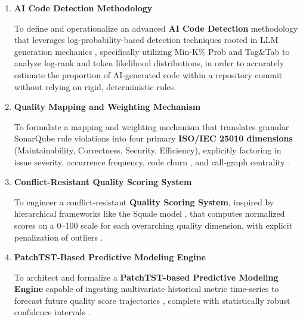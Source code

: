 \begin{enumerate}
    
    \item \textbf{AI Code Detection Methodology}

    To define and operationalize an advanced \textbf{AI Code Detection} methodology that leverages log-probability-based detection techniques rooted in LLM generation mechanics \parencite{excode_robust_explainable_model_detect_ai_generated_code}, specifically utilizing Min-K\% Prob and Tag\&Tab to analyze log-rank and token likelihood distributions, in order to accurately estimate the proportion of AI-generated code within a repository commit without relying on rigid, deterministic rules.
    
    \item \textbf{Quality Mapping and Weighting Mechanism}
    
    To formulate a mapping and weighting mechanism that translates granular SonarQube rule violations \parencite{sonarqube_metrics_definition} into four primary \textbf{ISO/IEC 25010 dimensions} \parencite{isoiec25010_quality_model_emergentmind} (Maintainability, Correctness, Security, Efficiency), explicitly factoring in issue severity, occurrence frequency, code churn \parencite{relative_code_churn_defect_density}, and call-graph centrality \parencite{centrality_in_networks_finding_most_important_nodes}.
    
    \item \textbf{Conflict-Resistant Quality Scoring System}
    
    To engineer a conflict-resistant \textbf{Quality Scoring System}, inspired by hierarchical frameworks like the Squale model \parencite{squale_model_practice_based_industrial_quality_model, computing_weighted_average_in_squale}, that computes normalized scores on a 0--100 scale \parencite{min_max_and_z_score_normalization, normalize_data_between_0_and_100} for each overarching quality dimension, with explicit penalization of outliers \parencite{mord11a_continuous_weighted_metric_aggregation}.
    
    \item \textbf{PatchTST-Based Predictive Modeling Engine}
    
    To architect and formalize a \textbf{PatchTST-based Predictive Modeling Engine} \parencite{decompatchtst_hybrid_framework, patchtst_nixtla} capable of ingesting multivariate historical metric time-series to forecast future quality score trajectories \parencite{comparative_analysis_lstm_gru_transformer_construction_cost}, complete with statistically robust confidence intervals \parencite{fault_prediction_software_metrics_sonarqube_rules}.
    

\end{enumerate}
